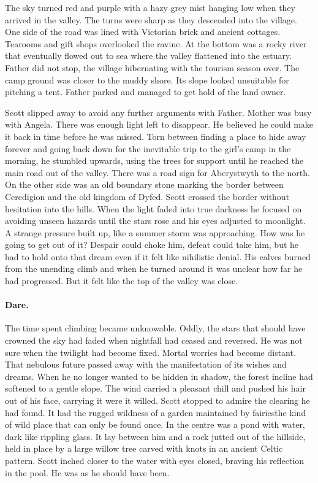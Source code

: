 The sky turned red and purple with a hazy grey mist hanging low when
they arrived in the valley. The turns were sharp as they descended into
the village. One side of the road was lined with Victorian brick and
ancient cottages. Tearooms and gift shops overlooked the ravine. At
the bottom was a rocky river that eventually flowed out to sea where
the valley flattened into the estuary. Father did not stop, the
village hibernating with the tourism season over. The camp ground was
closer to the muddy shore. Its slope looked unsuitable for pitching a
tent. Father parked and managed to get hold of the land owner.

Scott slipped away to avoid any further arguments with Father. Mother
was busy with Angela. There was enough light left to disappear. He
believed he could make it back in time before he was missed. Torn
between finding a place to hide away forever and going back down for
the inevitable trip to the girl's camp in the morning, he stumbled
upwards, using the trees for support until he reached the main road
out of the valley. There was a road sign for Aberystwyth to the north. On the
other side was an old boundary stone marking the border between
Ceredigion and the old kingdom of Dyfed. Scott crossed the border
without hesitation into the hills. When the light faded into true
darkness he focused on avoiding unseen hazards until the stars rose
and his eyes adjusted to moonlight. A strange pressure built up, like a
summer storm was approaching. How was he going to get out of it?
Despair could choke him, defeat could take him, but he had to hold
onto that dream even if it felt like nihilistic denial. His calves
burned from the unending climb and when he turned around it was
unclear how far he had progressed. But it felt like the top of the
valley was close.

\paragraph{Dare.}

The time spent climbing became unknowable. Oddly, the stars that
should have crowned the sky had faded when nightfall had ceased
and reversed. He was not sure when the twilight had become
fixed. Mortal worries had become distant. That nebulous future passed
away with the manifestation of its wishes and dreams. When he no
longer wanted to be hidden in shadow, the forest incline had softened
to a gentle slope. The wind carried a pleasant chill and pushed his
hair out of his face, carrying it were it willed. Scott stopped to
admire the clearing he had found. It had the rugged wildness of a
garden maintained by fairies\=the kind of wild place that can only be
found once. In the centre was a pond with water, dark like rippling
glass. It lay between him and a rock jutted out of the hillside,
held in place by a large willow tree carved with knots in an ancient
Celtic pattern. Scott inched closer to the water with eyes
closed, braving his reflection in the pool. He was as he should have
been.

